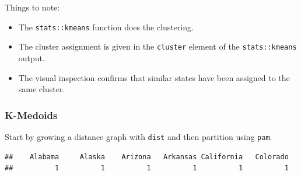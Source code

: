 \documentclass[]{book}
\newenvironment{Shaded}{\begin{snugshade}}{\end{snugshade}}
\newcommand{\DataTypeTok}[1]{\textcolor[rgb]{0.13,0.29,0.53}{#1}}
\newcommand{\DecValTok}[1]{\textcolor[rgb]{0.00,0.00,0.81}{#1}}
\newcommand{\FloatTok}[1]{\textcolor[rgb]{0.00,0.00,0.81}{#1}}
\newcommand{\KeywordTok}[1]{\textcolor[rgb]{0.13,0.29,0.53}{\textbf{#1}}}
\newcommand{\NormalTok}[1]{#1}
\newcommand{\OperatorTok}[1]{\textcolor[rgb]{0.81,0.36,0.00}{\textbf{#1}}}
\newcommand{\StringTok}[1]{\textcolor[rgb]{0.31,0.60,0.02}{#1}}
\providecommand{\tightlist}{%
  \setlength{\itemsep}{0pt}\setlength{\parskip}{0pt}}
\theoremstyle{definition}
\theoremstyle{definition}
\theoremstyle{definition}
\theoremstyle{remark}
\begin{document}
Things to note:

\begin{itemize}
\tightlist
\item
  The \texttt{stats::kmeans} function does the clustering.
\item
  The cluster assignment is given in the \texttt{cluster} element of the \texttt{stats::kmeans} output.
\item
  The visual inspection confirms that similar states have been assigned to the same cluster.
\end{itemize}

\hypertarget{k-medoids-1}{%
\subsubsection{K-Medoids}\label{k-medoids-1}}

Start by growing a distance graph with \texttt{dist} and then partition using \texttt{pam}.

\begin{Shaded}
\end{Shaded}

\begin{verbatim}
##    Alabama     Alaska    Arizona   Arkansas California   Colorado 
##          1          1          1          1          1          1
\end{verbatim}

\begin{Shaded}
\end{Shaded}
\end{document}
